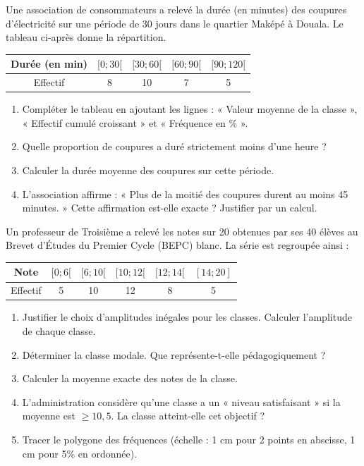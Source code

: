 \documentclass[11pt]{article}
\begin{document}
\begin{exercice}
Une association de consommateurs a relevé la durée (en minutes) des coupures d'électricité sur une période de 30 jours dans le quartier Maképé à Douala. Le tableau ci-après donne la répartition.

\begin{center}
\begin{tabular}{|c|c|c|c|c|}
\hline
Durée (en min) & $[0; 30[$ & $[30; 60[$ & $[60; 90[$ & $[90; 120[$ \\
\hline
Effectif & 8 & 10 & 7 & 5 \\
\hline
\end{tabular}
\end{center}

\begin{enumerate}
    \item Compléter le tableau en ajoutant les lignes : « Valeur moyenne de la classe », « Effectif cumulé croissant » et « Fréquence en \% ».
    \item Quelle proportion de coupures a duré strictement moins d'une heure ?
    \item Calculer la durée moyenne des coupures sur cette période.
    \item L'association affirme : « Plus de la moitié des coupures durent au moins 45 minutes. » Cette affirmation est-elle exacte ? Justifier par un calcul.
\end{enumerate}
\end{exercice}

\begin{exercice}
Un professeur de Troisième a relevé les notes sur 20 obtenues par ses 40 élèves au Brevet d'Études du Premier Cycle (BEPC) blanc. La série est regroupée ainsi :

\begin{center}
\begin{tabular}{|c|c|c|c|c|c|}
\hline
Note & $[0; 6[$ & $[6; 10[$ & $[10; 12[$ & $[12; 14[$ & $[14; 20]$ \\
\hline
Effectif & 5 & 10 & 12 & 8 & 5 \\
\hline
\end{tabular}
\end{center}

\begin{enumerate}
    \item Justifier le choix d'amplitudes inégales pour les classes. Calculer l'amplitude de chaque classe.
    \item Déterminer la classe modale. Que représente-t-elle pédagogiquement ?
    \item Calculer la moyenne exacte des notes de la classe.
    \item L'administration considère qu'une classe a un « niveau satisfaisant » si la moyenne est $\ge 10,5$. La classe atteint-elle cet objectif ?
    \item Tracer le polygone des fréquences (échelle : 1 cm pour 2 points en abscisse, 1 cm pour 5\% en ordonnée).
\end{enumerate}
\end{exercice}
\end{document}
